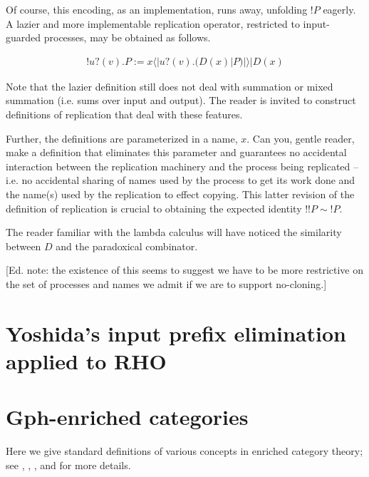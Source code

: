 \documentclass{llncs}
\newcommand{\lliftb}{\langle\!|}
\newcommand{\rliftb}{|\!\rangle}
\newcommand{\binpar}[2]{#1 | #2}
\newcommand{\prefix}[3]{#1?(#2) . #3}
\newcommand{\lift}[2]{#1 \lliftb #2 \rliftb}
\newcommand{\bangp}[1]{! #1}
\begin{document}
Of course, this encoding, as an implementation, runs away, unfolding
$\bangp{P}$ eagerly. A lazier and more implementable replication
operator, restricted to input-guarded processes, may be obtained as follows.

\begin{eqnarray}
\bangp{\prefix{u}{v}{P}} 
	:= 
	\binpar{\lift{x}{\prefix{u}{v}{(\binpar{D(x)}{P})}}}{D(x)} \nonumber
\end{eqnarray}

\begin{remark}
  Note that the lazier definition still does not deal with summation
  or mixed summation (i.e. sums over input and output). The reader is
  invited to construct definitions of replication that deal with these
  features. 

  Further, the definitions are parameterized in a name, $x$. Can you,
  gentle reader, make a definition that eliminates this parameter and
  guarantees no accidental interaction between the replication
  machinery and the process being replicated -- i.e. no accidental
  sharing of names used by the process to get its work done and the
  name(s) used by the replication to effect copying. This latter
  revision of the definition of replication is crucial to obtaining
  the expected identity $!!P \sim !P$.
\end{remark}

\begin{remark}\label{rem:paradoxical_combinator}
  The reader familiar with the lambda calculus will have noticed the
  similarity between $D$ and the paradoxical combinator.

  [Ed. note: the existence of this seems to suggest we have to be more
  restrictive on the set of processes and names we admit if we are to
  support no-cloning.]
\end{remark}

\section{Yoshida's input prefix elimination applied to RHO}

\section{Gph-enriched categories}
Here we give standard definitions of various concepts in enriched category theory; see \cite{Kelly},
\cite{Power},
\cite{LackRosicky},
and \cite{Trimble} for more details.
\end{document}
